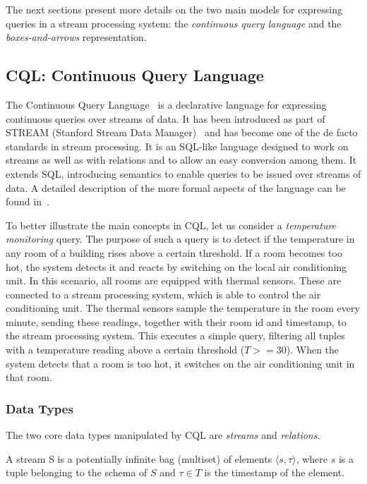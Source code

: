 The next sections present more details on the two main models for expressing queries in a
stream processing system: the \emph{continuous query language} and the \emph{boxes-and-arrows}
representation.

\subsection*{CQL: Continuous Query Language}
\label{sec:cql}

The Continuous Query Language~\cite{cql} is a declarative language for expressing continuous queries
over streams of data. It has been introduced as part of STREAM (Stanford Stream Data
Manager)~\cite{stream} and has become one of the de facto standards in stream processing. It is an
SQL-like language designed to work on streams as well as with relations and to allow an easy conversion
among them. It extends SQL, introducing semantics to enable queries to be issued over streams of data. A detailed description of the
more formal aspects of the language can be found in~\cite{cql-foundation}. 

To better illustrate the main concepts in CQL, let us consider a \textit{temperature monitoring} query.
The purpose of such a query is to detect if the temperature in any room of a building rises above a
certain threshold. If a room becomes too hot, the system detects it and reacts by switching on the local
air conditioning unit. In this scenario, all rooms are equipped with thermal sensors.
These are connected to a stream processing system, which is able to control the air conditioning unit.
The thermal sensors sample the temperature in the room every minute, sending these readings, together with
their room id and timestamp, to the stream processing system. This executes a simple query, filtering
all tuples with a temperature reading above a certain threshold (\eg $T>=30$). When the system
detects that a room is too hot, it switches on the air conditioning unit in that room. 
\subsubsection*{Data Types}

The two core data types manipulated by CQL are \textit{streams} and \textit{relations}.

\begin{definition}[Stream]{A stream S is a potentially infinite bag (multiset) of elements $\langle s,
\tau \rangle$, where $s$ is a tuple belonging to the schema of $S$ and $\tau
\in T$ is the timestamp of the element.}
\end{definition}

